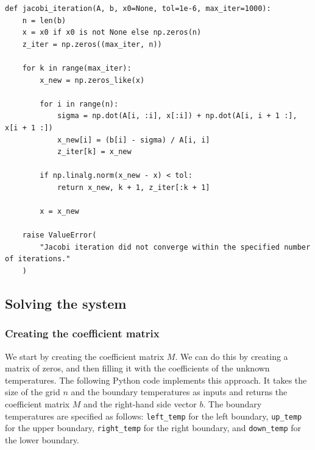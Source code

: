 \documentclass{article}
\begin{document}
\begin{lstlisting}[style=Python]
def jacobi_iteration(A, b, x0=None, tol=1e-6, max_iter=1000):
    n = len(b)
    x = x0 if x0 is not None else np.zeros(n)
    z_iter = np.zeros((max_iter, n))

    for k in range(max_iter):
        x_new = np.zeros_like(x)

        for i in range(n):
            sigma = np.dot(A[i, :i], x[:i]) + np.dot(A[i, i + 1 :], x[i + 1 :])
            x_new[i] = (b[i] - sigma) / A[i, i]
            z_iter[k] = x_new

        if np.linalg.norm(x_new - x) < tol:
            return x_new, k + 1, z_iter[:k + 1]

        x = x_new

    raise ValueError(
        "Jacobi iteration did not converge within the specified number of iterations."
    )
\end{lstlisting}

\begin{multicols}{2}
\subsection{Solving the system}
\subsubsection{Creating the coefficient matrix}
We start by creating the coefficient matrix $M$.
We can do this by creating a matrix of zeros, and then filling it with the
coefficients of the unknown temperatures. The following Python code implements
this approach. It takes the size of the grid $n$ and the boundary temperatures
as inputs and returns the coefficient matrix $M$ and the right-hand side vector
$b$. The boundary temperatures are specified as follows: \texttt{left\_temp} for
the left boundary, \texttt{up\_temp} for the upper boundary, \texttt{right\_temp}
for the right boundary, and \texttt{down\_temp} for the lower boundary.
\end{multicols}
\end{document}
